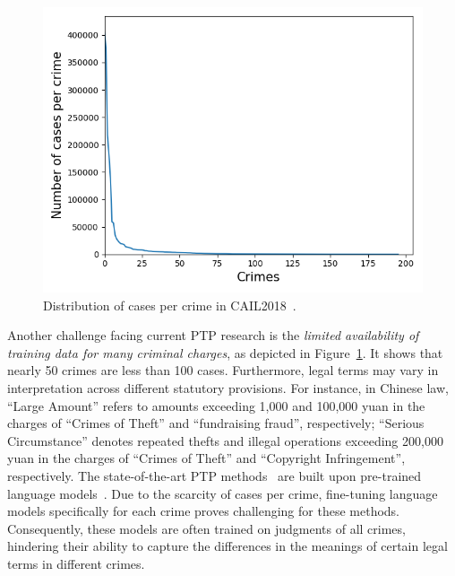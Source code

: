 \begin{figure}[!t]
    \centering
    \includegraphics[width=0.9\columnwidth]{figs/sta2.png}
    \caption{Distribution of cases per crime in CAIL2018~\cite{DBLP:journals/corr/abs-1807-02478}. 
    }
    \label{fig:sta}
    \vspace{-1.5em}
\end{figure}

Another challenge facing current PTP research is the \textit{limited availability of training data for many criminal charges}, as depicted in Figure~\ref{fig:sta}. It shows that nearly 50 crimes are less than 100 cases.
Furthermore, legal terms may vary in interpretation across different statutory provisions. For instance, in Chinese law, ``Large Amount'' refers to amounts exceeding 1,000 and 100,000 yuan in the charges of ``Crimes of Theft'' and ``fundraising fraud'', respectively; ``Serious Circumstance'' denotes repeated thefts and illegal operations exceeding 200,000 yuan in the charges of ``Crimes of Theft'' and ``Copyright Infringement'', respectively. 
The state-of-the-art PTP methods~\cite{neurjudge,ML-LJP} are built upon pre-trained language models~\cite{devlin-etal-2019-bert}. Due to the scarcity of cases per crime, 
fine-tuning language models specifically for each crime proves challenging for these methods. Consequently, these models are often trained on judgments of all crimes, hindering their ability to capture the differences in the meanings of certain legal terms in different crimes.

